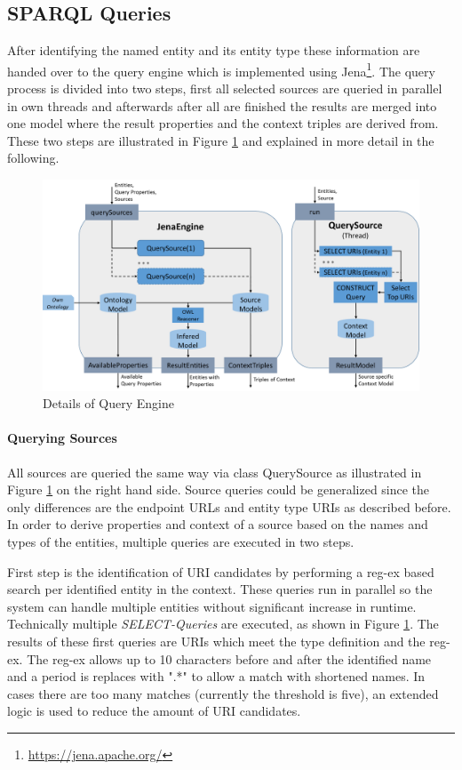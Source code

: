 \documentclass[11pt,titlepage,oneside,openany]{article}
\begin{document}
\subsection{SPARQL Queries}
After identifying the named entity and its entity type these information are handed over to the query engine which is implemented using Jena\footnote{\url{https://jena.apache.org/}}. The query process is divided into two steps, first all selected sources are queried in parallel in own threads and afterwards after all are finished the results are merged into one model where the result properties and the context triples are derived from. These two steps are illustrated in Figure \ref{fig:details_query} and explained in more detail in the following.
\begin{figure}[ht]
	\centering
	\includegraphics[width=1\textwidth]{QueryEngineDetails}
	\caption{Details of Query Engine}
	\label{fig:details_query}
\end{figure}

\paragraph{Querying Sources}
All sources are queried the same way via class QuerySource as illustrated in Figure \ref{fig:details_query} on the right hand side. Source queries could be generalized since the only differences are the endpoint URLs and entity type URIs as described before. In order to derive properties and context of a source based on the names and types of the entities, multiple queries are executed in two steps.

First step is the identification of URI candidates by performing a reg-ex based search per identified entity in the context. These queries run in parallel so the system can handle multiple entities without significant increase in runtime. Technically multiple \textit{SELECT-Queries} are executed, as shown in Figure \ref{fig:details_query}. The results of these first queries are URIs which meet the type definition and the reg-ex. The reg-ex allows up to 10 characters before and after the identified name and a period is replaces with ".*" to allow a match with shortened names. In cases there are too many matches (currently the threshold is five), an extended logic is used to reduce the amount of URI candidates. 
\end{document}

